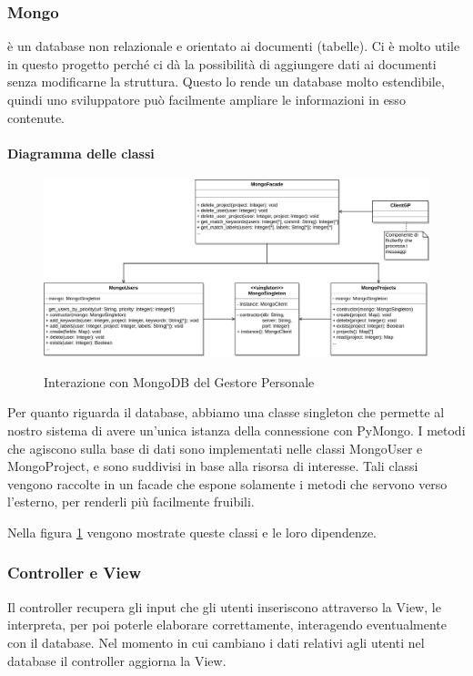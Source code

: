 \subsubsection{Mongo} \label{Mongo}
 è un database non relazionale e orientato ai documenti (tabelle). Ci è molto utile in questo progetto perché ci dà la possibilità di aggiungere dati ai documenti senza modificarne la struttura.
Questo lo rende un database molto estendibile, quindi uno sviluppatore può facilmente ampliare le informazioni in esso contenute.

    \paragraph{Diagramma delle classi}

    \begin{figure}[H]
        \centering
        \includegraphics[width=\textwidth]{img/GP-Mongo.png}\\
        \caption{Interazione con MongoDB del Gestore Personale}
        \label{fig:GP-Mongo}
    \end{figure}

    Per quanto riguarda il database, abbiamo una classe singleton che permette al nostro sistema di avere un'unica istanza della connessione con PyMongo.
    I metodi che agiscono sulla base di dati sono implementati nelle classi MongoUser e MongoProject, e sono suddivisi in base alla risorsa di interesse.
    Tali classi vengono raccolte in un facade che espone solamente i metodi che servono verso l’esterno, per renderli più facilmente fruibili. \par
    Nella figura \ref{fig:GP-Mongo} vengono mostrate queste classi e le loro dipendenze.


\subsubsection{Controller e View}
Il controller recupera gli input che gli utenti inseriscono attraverso la View, le interpreta, per poi poterle elaborare correttamente, interagendo eventualmente con il database. Nel momento in cui cambiano i dati relativi agli utenti nel database il controller aggiorna la View.


